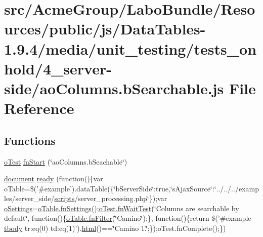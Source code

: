 \hypertarget{4__server-side_2ao_columns_8b_searchable_8js}{\section{src/\+Acme\+Group/\+Labo\+Bundle/\+Resources/public/js/\+Data\+Tables-\/1.9.4/media/unit\+\_\+testing/tests\+\_\+onhold/4\+\_\+server-\/side/ao\+Columns.b\+Searchable.\+js File Reference}
\label{4__server-side_2ao_columns_8b_searchable_8js}
}
\subsection*{Functions}
\begin{DoxyCompactItemize}
\item 
\hyperlink{unit__test_8js_a3b2d259e2df3b6860d9047a92d09d0d6}{o\+Test} \hyperlink{4__server-side_2ao_columns_8b_searchable_8js_acca45faefca5f1689367270cb373392d}{fn\+Start} (\char`\"{}ao\+Columns.\+b\+Seachable\char`\"{})
\item 
\hyperlink{outside_events_8js_aa14f8e0338cced6720590fd2ea13bd4b}{document} \hyperlink{4__server-side_2ao_columns_8b_searchable_8js_a4321a08ca2a7cc586e64fa20cdf04d4d}{ready} (function()\{var o\+Table=\$('\#example').data\+Table(\{\char`\"{}b\+Server\+Side\char`\"{}\+:true,\char`\"{}s\+Ajax\+Source\char`\"{}\+:\char`\"{}../../../examples/server\+\_\+side/\hyperlink{tinymce_8jquery_8dev_8js_a09066d4d580eeec222f858d588b4cdef}{scripts}/server\+\_\+processing.\+php\char`\"{}\});var \hyperlink{model_8settings_8js_a4857b9c813b4dea010668e9555d0aca7}{o\+Settings}=\hyperlink{api_8methods_8js_a78f387fab92a85c2cb7830bc5d8a6141}{o\+Table.\+fn\+Settings}();\hyperlink{onhold_24__server-side_2__zero__config_8js_ab25c4d596771c0133cdc45178ce72c3d}{o\+Test.\+fn\+Wait\+Test}(\char`\"{}Columns are searchable by default\char`\"{}, function()\{\hyperlink{api_8methods_8js_a7b6987d0a9ab9c5303d10ef62790885d}{o\+Table.\+fn\+Filter}(\char`\"{}Camino\char`\"{});\}, function()\{return \$('\#example \hyperlink{core_8constructor_8js_a99b0542c7c50fe8757c55bf9dac5f3be}{tbody} tr\+:eq(0) td\+:eq(1)').\hyperlink{tinymce_8jquery_8dev_8js_ac2090bcf2ff968c0083d5de53a6544f3}{html}()==\char`\"{}Camino 1.\char`\"{};\});o\+Test.\+fn\+Complete();\})
\end{DoxyCompactItemize}


